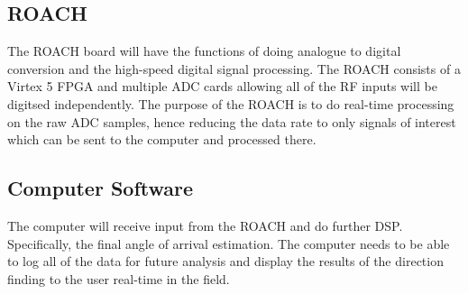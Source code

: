 \subsection{ROACH}
The ROACH board will have the functions of doing analogue to digital conversion and the high-speed digital signal processing. The ROACH consists of a Virtex 5 FPGA and multiple ADC cards allowing all of the RF inputs will be digitsed independently. The purpose of the ROACH is to do real-time processing on the raw ADC samples, hence reducing the data rate to only signals of interest which can be sent to the computer and processed there.

\subsection{Computer Software}
The computer will receive input from the ROACH and do further DSP. Specifically, the final angle of arrival estimation. The computer needs to be able to log all of the data for future analysis and display the results of the direction finding to the user real-time in the field.


